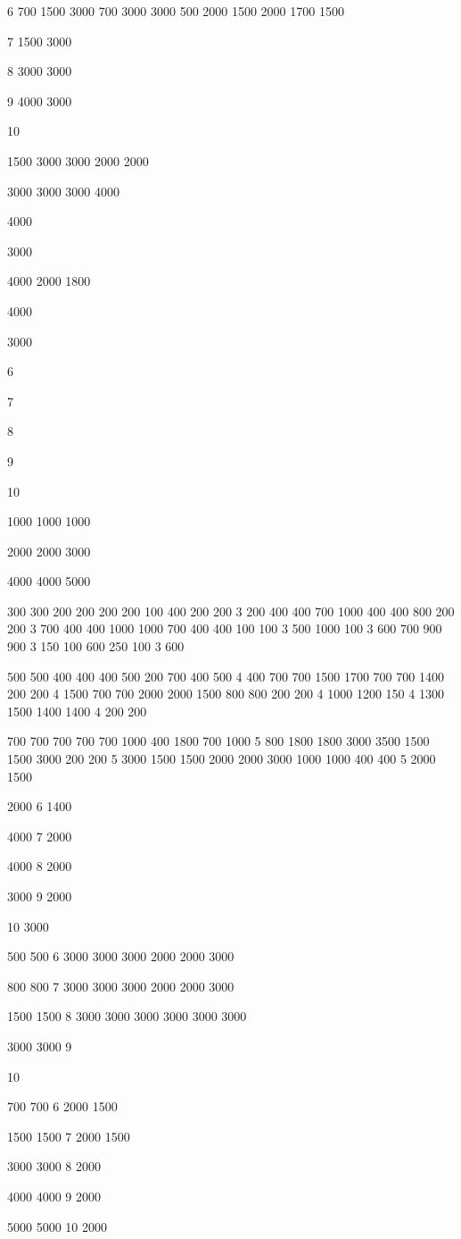 \documentclass[a4paper]{article}
\begin{document}
\begin{multicols}{3}
6
700
1500
3000
700
3000
3000
500
2000
1500
2000
1700
1500

7
1500
3000

8
3000
3000

9
4000
3000

10

1500
3000
3000
2000
2000

3000
3000
3000
4000

4000

3000

4000
2000
1800

4000

3000

6

7

8

9

10

1000
1000
1000

2000
2000
3000

4000
4000
5000

300
300
200
200
200
200
100
400
200
200
3
200
400
400
700
1000
400
400
800
200
200
3
700
400
400
1000
1000
700
400
400
100
100
3
500
1000
100
3
600
700
900
900
3
150
100
600
250
100
3
600

500
500
400
400
400
500
200
700
400
500
4
400
700
700
1500
1700
700
700
1400
200
200
4
1500
700
700
2000
2000
1500
800
800
200
200
4
1000
1200
150
4
1300
1500
1400
1400
4
200
200

700
700
700
700
700
1000
400
1800
700
1000
5
800
1800
1800
3000
3500
1500
1500
3000
200
200
5
3000
1500
1500
2000
2000
3000
1000
1000
400
400
5
2000
1500

2000
6
1400

4000
7
2000

4000
8
2000

3000
9
2000

10
3000

500
500
6
3000
3000
3000
2000
2000
3000

800
800
7
3000
3000
3000
2000
2000
3000

1500
1500
8
3000
3000
3000
3000
3000
3000

3000
3000
9

10

700
700
6
2000
1500

1500
1500
7
2000
1500

3000
3000
8
2000

4000
4000
9
2000

5000
5000
10
2000


\end{multicols}
\end{document}
